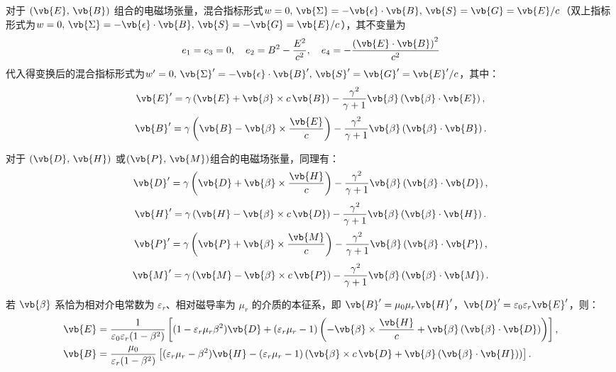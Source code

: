 \begin{exbox}
	对于 \((\vb{E}, \, \vb{B})\) 组合的电磁场张量，混合指标形式\(w = 0,\,\vb{\Sigma} = -\vb{\epsilon} \cdot \vb{B},\,\vb{S} = \vb{G} = \vb{E}/c\)（双上指标形式为\(w = 0,\,\vb{\Sigma} =- \vb{\epsilon} \cdot \vb{B},\,\vb{S} = -\vb{G} = \vb{E}/c\)），其不变量为
	\begin{align*}
		e_1=e_3=0,\quad e_2=B^2-\frac{E^2}{c^2},\quad e_4=-\frac{\left(\vb{E}\cdot\vb{B}\right)^2}{c^2}
	\end{align*}
	代入得变换后的混合指标形式为\(w' = 0,\,\vb{\Sigma}' =- \vb{\epsilon} \cdot \vb{B}',\,\vb{S}' = \vb{G}' = \vb{E}'/c\)，其中：
	\begin{align*}
		\vb{E}' = \gamma \left( \vb{E} + \vb{\beta} \times c \, \vb{B} \right) - \dfrac{\gamma^2}{\gamma + 1} \vb{\beta} \left( \vb{\beta} \cdot \vb{E} \right),
	\end{align*}
	\begin{align*}
		\vb{B}' = \gamma \left( \vb{B} - \vb{\beta} \times \dfrac{\vb{E}}{c} \right) - \dfrac{\gamma^2}{\gamma + 1} \vb{\beta} \left( \vb{\beta} \cdot \vb{B} \right).
	\end{align*}

	对于 \((\vb{D}, \, \vb{H})\) 或\((\vb{P}, \, \vb{M})\)组合的电磁场张量，同理有：
	\begin{align*}
		\vb{D}' = \gamma \left( \vb{D} + \vb{\beta} \times \dfrac{\vb{H}}{c} \right) - \dfrac{\gamma^2}{\gamma + 1} \vb{\beta} \left( \vb{\beta} \cdot \vb{D} \right),
	\end{align*}
	\begin{align*}
		\vb{H}' = \gamma \left( \vb{H} - \vb{\beta} \times c \, \vb{D} \right) - \dfrac{\gamma^2}{\gamma + 1} \vb{\beta} \left( \vb{\beta} \cdot \vb{H} \right).
	\end{align*}
	\begin{align*}
		\vb{P}' = \gamma \left( \vb{P} + \vb{\beta} \times \dfrac{\vb{M}}{c} \right) - \dfrac{\gamma^2}{\gamma + 1} \vb{\beta} \left( \vb{\beta} \cdot \vb{P} \right),
	\end{align*}
	\begin{align*}
		\vb{M}' = \gamma \left( \vb{M} - \vb{\beta} \times c \, \vb{P} \right) - \dfrac{\gamma^2}{\gamma + 1} \vb{\beta} \left( \vb{\beta} \cdot \vb{M} \right).
	\end{align*}

	若 \(\vb{\beta}\) 系恰为相对介电常数为 \(\varepsilon_r\)、相对磁导率为 \(\mu_r\) 的介质的本征系，即 \(\vb{B}' = \mu_0 \mu_r \vb{H}'\)，\(\vb{D}' = \varepsilon_0 \varepsilon_r \vb{E}'\)，则：
	\begin{align*}
		\vb{E} & = \dfrac{1}{\varepsilon_0 \varepsilon_r (1 - \beta^2)} \left[ (1 - \varepsilon_r \mu_r \beta^2) \vb{D} + (\varepsilon_r \mu_r - 1) \left( -\vb{\beta} \times \dfrac{\vb{H}}{c} + \vb{\beta} \left( \vb{\beta} \cdot \vb{D} \right) \right) \right], \\
		\vb{B} & = \dfrac{\mu_0}{\varepsilon_r (1 - \beta^2)} \left[ (\varepsilon_r \mu_r - \beta^2) \vb{H} - (\varepsilon_r \mu_r - 1) \left( \vb{\beta} \times c \, \vb{D} + \vb{\beta} \left( \vb{\beta} \cdot \vb{H} \right) \right) \right].
	\end{align*}
\end{exbox}

